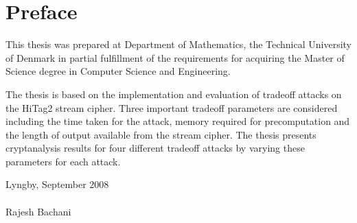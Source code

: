 
\chapter*{Preface}

This thesis was prepared at Department of Mathematics, the Technical University of Denmark in partial fulfillment of the requirements for acquiring the Master of Science degree in Computer Science and Engineering.

The thesis is based on the implementation and evaluation of tradeoff attacks on the HiTag2 stream cipher. Three important tradeoff parameters are considered including the time taken for the attack, memory required for precomputation and the length of output available from the stream cipher. The thesis presents cryptanalysis results for four different tradeoff attacks by varying these parameters for each attack. 

\vspace{20mm}
\mbox{}\hfill
\begin{minipage}[t]{80mm}
Lyngby, September 2008\\
 \\
Rajesh Bachani
\end{minipage}
